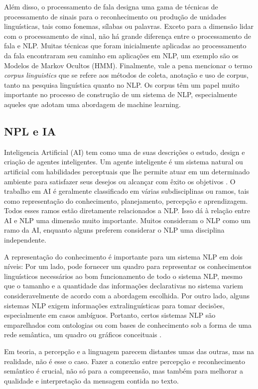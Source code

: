 \documentclass[
	12pt,				%
	openright,			%
	oneside,			%
	a4paper,			%
	english,			%
	spanish,			%
	brazil				%
	]{abntex2}
\begin{document}
Além disso, o processamento de fala designa uma gama de técnicas de processamento de sinais para o reconhecimento ou produção de unidades linguísticas, tais como fonemas, sílabas ou palavras. Exceto para a dimensão lidar com o processamento de sinal, não há grande diferença entre o processamento de fala e NLP. Muitas técnicas que foram inicialmente aplicadas ao processamento da fala encontraram seu caminho em aplicações em NLP, um exemplo são os Modelos de Markov Ocultos (HMM). Finalmente, vale a pena mencionar o termo \textit{corpus linguistics}  que se refere aos métodos de coleta, anotação e uso de corpus, tanto na pesquisa linguística quanto no NLP. Os corpus têm um papel muito importante no processo de construção de um sistema de NLP, especialmente aqueles que adotam uma abordagem de machine learning.

	\subsection*{NPL e IA}
	Inteligencia Artificial (AI) tem como uma de suas descrições o estudo, design e criação de agentes inteligentes. Um agente inteligente é um sistema natural ou artificial com habilidades perceptuais que lhe permite atuar em um determinado ambiente para satisfazer seus desejos ou alcançar com êxito os objetivos \cite{norvig}. O trabalho em AI é geralmente classificado em várias subdisciplinas ou ramos, tais como representação do conhecimento, planejamento, percepção e aprendizagem. Todos esses ramos estão diretamente relacionados a NLP. Isso dá à relação entre AI e NLP uma dimensão muito importante. Muitos consideram o NLP como um ramo da AI, enquanto alguns preferem considerar o NLP uma disciplina independente. 

	
A representação do conhecimento é importante para um sistema NLP em dois níveis: Por um lado, pode fornecer um quadro para representar os conhecimentos linguísticos necessários ao bom funcionamento de todo o sistema NLP, mesmo que o tamanho e a quantidade das informações declarativas no sistema variem consideravelmente de acordo com a abordagem escolhida. Por outro lado, alguns sistemas NLP exigem informações extralinguísticas para tomar decisões, especialmente em casos ambíguos. Portanto, certos sistemas NLP são emparelhados com ontologias ou com bases de conhecimento sob a forma de uma rede semântica, um quadro ou gráficos conceituais \cite{book_natural_lang}.

Em teoria, a percepção e a linguagem parecem distantes umas das outras, mas na realidade, não é esse o caso. Fazer a conexão entre percepção e reconhecimento semântico é crucial, não só para a compreensão, mas também para melhorar a qualidade e interpretação da mensagem contida no texto. 
\end{document}
